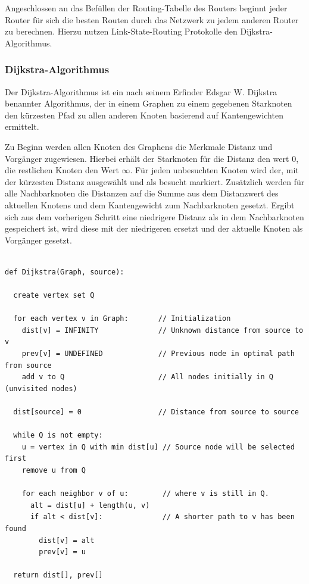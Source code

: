 \documentclass[11pt,a4paper,final]{article}
\begin{document}
Angeschlossen an das Befüllen der Routing-Tabelle des Routers beginnt jeder Router für sich die besten Routen durch das Netzwerk zu jedem anderen Router zu berechnen.
Hierzu nutzen Link-State-Routing Protokolle den Dijkstra-Algorithmus.
\subsubsection{Dijkstra-Algorithmus}
Der Dijkstra-Algorithmus ist ein nach seinem Erfinder Edsgar W. Dijkstra benannter Algorithmus, der in einem Graphen zu einem gegebenen Starknoten den kürzesten Pfad zu allen anderen Knoten basierend auf Kantengewichten ermittelt.

Zu Beginn werden allen Knoten des Graphens die Merkmale Distanz und Vorgänger zugewiesen. Hierbei erhält der Starknoten für die Distanz den wert $0$, die restlichen Knoten den Wert $\infty$.
Für jeden unbesuchten Knoten wird der, mit der kürzesten Distanz ausgewählt und als besucht markiert.
Zusätzlich werden für alle Nachbarknoten die Distanzen auf die Summe aus dem Distanzwert des aktuellen Knotens und dem Kantengewicht zum Nachbarknoten gesetzt.
Ergibt sich aus dem vorherigen Schritt eine niedrigere Distanz als in dem Nachbarknoten gespeichert ist, wird diese mit der niedrigeren ersetzt und der aktuelle Knoten als Vorgänger gesetzt.\\\\
\begin{verbatim}
def Dijkstra(Graph, source):

  create vertex set Q

  for each vertex v in Graph:       // Initialization
    dist[v] = INFINITY              // Unknown distance from source to v
    prev[v] = UNDEFINED             // Previous node in optimal path from source
    add v to Q                      // All nodes initially in Q (unvisited nodes)

  dist[source] = 0                  // Distance from source to source

  while Q is not empty:
    u = vertex in Q with min dist[u] // Source node will be selected first
    remove u from Q

    for each neighbor v of u:        // where v is still in Q.
      alt = dist[u] + length(u, v)
      if alt < dist[v]:              // A shorter path to v has been found
        dist[v] = alt
        prev[v] = u

  return dist[], prev[]
\end{verbatim}
\end{document}

